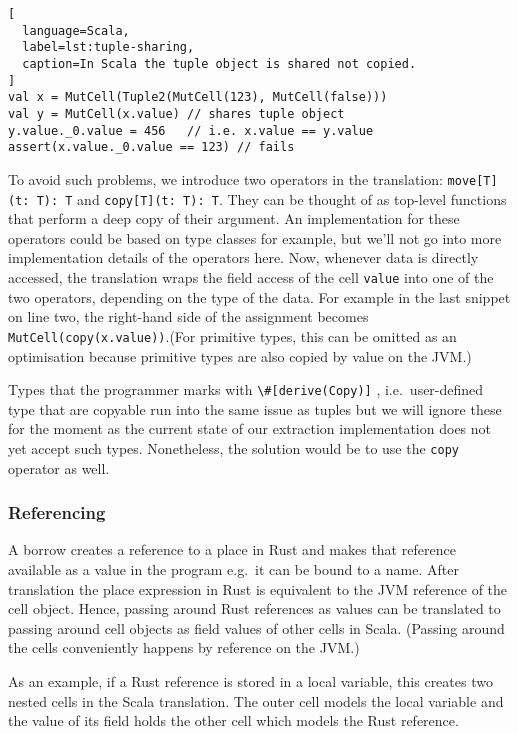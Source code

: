 \begin{lstlisting}[
  language=Scala,
  label=lst:tuple-sharing,
  caption=In Scala the tuple object is shared not copied.
]
val x = MutCell(Tuple2(MutCell(123), MutCell(false)))
val y = MutCell(x.value) // shares tuple object
y.value._0.value = 456   // i.e. x.value == y.value
assert(x.value._0.value == 123) // fails
\end{lstlisting}

To avoid such problems, we introduce two operators in the translation:
\passthrough{\lstinline!move[T](t: T): T!} and
\passthrough{\lstinline!copy[T](t: T): T!}. They can be thought of as
top-level functions that perform a deep copy of their argument. An
implementation for these operators could be based on type classes for
example, but we'll not go into more implementation details of the
operators here. Now, whenever data is directly accessed, the translation
wraps the field access of the cell \passthrough{\lstinline!value!} into
one of the two operators, depending on the type of the data. For example
in the last snippet on line two, the right-hand side of the assignment
becomes \lstinline!MutCell(copy(x.value))!.(For primitive
types, this can be omitted as an optimisation because primitive types
are also copied by value on the JVM.)

Types that the programmer marks with
\passthrough{\lstinline!\#[derive(Copy)]!} , i.e.~user-defined type that
are copyable run into the same issue as tuples but we will ignore these
for the moment as the current state of our extraction implementation
does not yet accept such types. Nonetheless, the solution would be to
use the \passthrough{\lstinline!copy!} operator as well.

\subsubsection{Referencing}

A borrow creates a reference to a place in Rust and makes that reference
available as a value in the program e.g.~it can be bound to a name.
After translation the place expression in Rust is equivalent to the JVM
reference of the cell object. Hence, passing around Rust references as
values can be translated to passing around cell objects as field values
of other cells in Scala. (Passing around the cells conveniently happens
by reference on the JVM.)

As an example, if a Rust reference is stored in a local variable, this
creates two nested cells in the Scala translation. The outer cell models
the local variable and the value of its field holds the other cell which
models the Rust reference.

